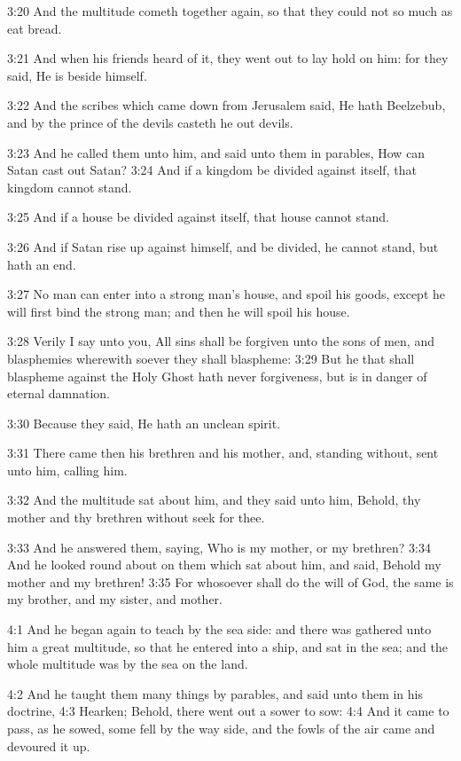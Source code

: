 3:20 And the multitude cometh together again, so that they could not so much as eat bread.

3:21 And when his friends heard of it, they went out to lay hold on him: for they said, He is beside himself.

3:22 And the scribes which came down from Jerusalem said, He hath Beelzebub, and by the prince of the devils casteth he out devils.

3:23 And he called them unto him, and said unto them in parables, How can Satan cast out Satan?  3:24 And if a kingdom be divided against itself, that kingdom cannot stand.

3:25 And if a house be divided against itself, that house cannot stand.

3:26 And if Satan rise up against himself, and be divided, he cannot stand, but hath an end.

3:27 No man can enter into a strong man's house, and spoil his goods, except he will first bind the strong man; and then he will spoil his house.

3:28 Verily I say unto you, All sins shall be forgiven unto the sons of men, and blasphemies wherewith soever they shall blaspheme: 3:29 But he that shall blaspheme against the Holy Ghost hath never forgiveness, but is in danger of eternal damnation.

3:30 Because they said, He hath an unclean spirit.

3:31 There came then his brethren and his mother, and, standing without, sent unto him, calling him.

3:32 And the multitude sat about him, and they said unto him, Behold, thy mother and thy brethren without seek for thee.

3:33 And he answered them, saying, Who is my mother, or my brethren?  3:34 And he looked round about on them which sat about him, and said, Behold my mother and my brethren!  3:35 For whosoever shall do the will of God, the same is my brother, and my sister, and mother.

4:1 And he began again to teach by the sea side: and there was gathered unto him a great multitude, so that he entered into a ship, and sat in the sea; and the whole multitude was by the sea on the land.

4:2 And he taught them many things by parables, and said unto them in his doctrine, 4:3 Hearken; Behold, there went out a sower to sow: 4:4 And it came to pass, as he sowed, some fell by the way side, and the fowls of the air came and devoured it up.

